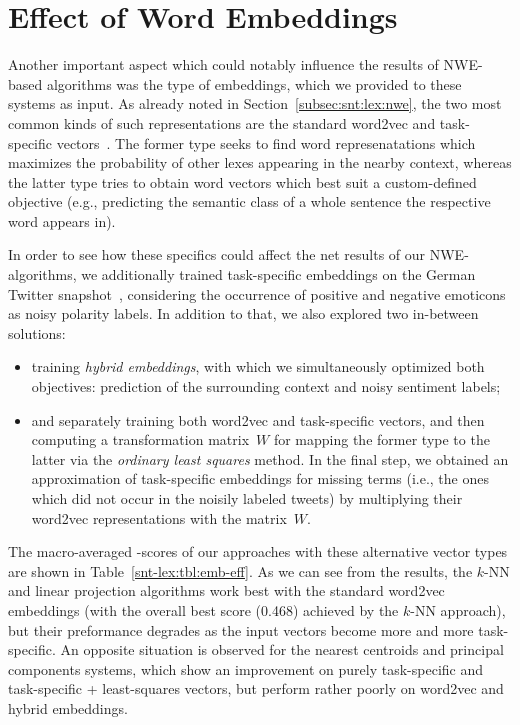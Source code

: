 \section{Effect of Word Embeddings}\label{subsec:snt-lex:eowet}

Another important aspect which could notably influence the results of
NWE-based algorithms was the type of embeddings, which we provided to
these systems as input.  As already noted in
Section~\ref{subsec:snt:lex:nwe}, the two most common kinds of such
representations are the standard word2vec and task-specific
vectors~\cite{Mikolov:13,Collobert:11}.  The former type seeks to find
word represenatations which maximizes the probability of other lexes
appearing in the nearby context, whereas the latter type tries to
obtain word vectors which best suit a custom-defined objective (e.g.,
predicting the semantic class of a whole sentence the respective word
appears in).

In order to see how these specifics could affect the net results of
our NWE-algorithms, we additionally trained task-specific embeddings
on the German Twitter snapshot~\cite{Scheffler:14}, considering the
occurrence of positive and negative emoticons as noisy polarity
labels.  In addition to that, we also explored two in-between
solutions:
\begin{itemize}
\item training \emph{hybrid embeddings}, with which we simultaneously
  optimized both objectives: prediction of the surrounding context and
  noisy sentiment labels;
\item and separately training both word2vec and task-specific vectors,
  and then computing a transformation matrix~$W$ for mapping the
  former type to the latter via the \emph{ordinary least squares}
  method.  In the final step, we obtained an approximation of
  task-specific embeddings for missing terms (i.e., the ones which did
  not occur in the noisily labeled tweets) by multiplying their
  word2vec representations with the matrix~$W$.
\end{itemize}

The macro-averaged \F-scores of our approaches with these alternative
vector types are shown in Table~\ref{snt-lex:tbl:emb-eff}.  As we can
see from the results, the $k$-NN and linear projection algorithms work
best with the standard word2vec embeddings (with the overall best
score (0.468) achieved by the $k$-NN approach), but their preformance
degrades as the input vectors become more and more task-specific.  An
opposite situation is observed for the nearest centroids and principal
components systems, which show an improvement on purely task-specific
and task-specific + least-squares vectors, but perform rather poorly
on word2vec and hybrid embeddings.

